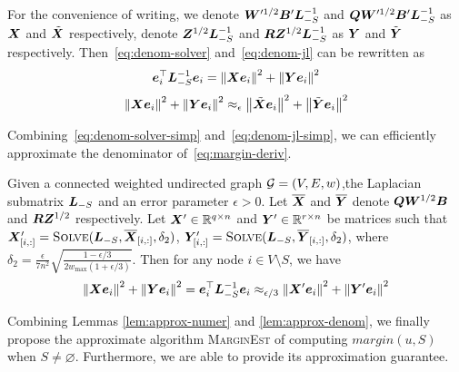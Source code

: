 \documentclass[sigconf]{acmart}
\begin{document}
For the convenience of writing, we denote \(\boldsymbol{W}'^{1/2}\boldsymbol{B}'\boldsymbol{L}_{-S}^{-1}\) and \(\boldsymbol{Q}\boldsymbol{W}'^{1/2}\boldsymbol{B}'\boldsymbol{L}_{-S}^{-1}\) as \(\boldsymbol{X}\) and \(\tilde{\boldsymbol{X}}\) respectively, denote \(\boldsymbol{Z}^{1/2}\boldsymbol{L}_{-S}^{-1}\) and \(\boldsymbol{R}\boldsymbol{Z}^{1/2}\boldsymbol{L}_{-S}^{-1}\) as \(\boldsymbol{Y}\) and \(\tilde{\boldsymbol{Y}}\) respectively.
Then~\eqref{eq:denom-solver} and~\eqref{eq:denom-jl} can be rewritten as
\begin{equation}\label{eq:denom-solver-simp}
    \boldsymbol{e}_i^\top\boldsymbol{L}_{-S}^{-1}\boldsymbol{e}_i=\left\Vert\boldsymbol{X}\boldsymbol{e}_i\right\Vert^2+\left\Vert\boldsymbol{Y}\boldsymbol{e}_i\right\Vert^2
\end{equation}
\begin{equation}\label{eq:denom-jl-simp}
    \left\Vert\boldsymbol{X}\boldsymbol{e}_i\right\Vert^2+\left\Vert\boldsymbol{Y}\boldsymbol{e}_i\right\Vert^2\approx_\epsilon\left\Vert\tilde{\boldsymbol{X}}\boldsymbol{e}_i\right\Vert^2+\left\Vert\tilde{\boldsymbol{Y}}\boldsymbol{e}_i\right\Vert^2
\end{equation}

Combining~\eqref{eq:denom-solver-simp} and~\eqref{eq:denom-jl-simp}, we can efficiently approximate the denominator of~\eqref{eq:margin-deriv}.
\begin{lemma}\label{lem:approx-denom}
    Given a connected weighted undirected graph \(\mathcal{G}=(V,E,w)\),the Laplacian submatrix \(\boldsymbol{L}_{-S}\) and an error parameter \(\epsilon>0\).
    Let \(\overline{\boldsymbol{X}}\) and \(\overline{\boldsymbol{Y}}\) denote \(\boldsymbol{Q}\boldsymbol{W}^{1/2}\boldsymbol{B}\) and \(\boldsymbol{R}\boldsymbol{Z}^{1/2}\) respectively.
    Let \(\boldsymbol{X}'\in\mathbb{R}^{q\times n}\) and \(\boldsymbol{Y}'\in\mathbb{R}^{r\times n}\) be matrices such that \(\boldsymbol{X}'_{[i,:]}=\textsc{Solve}(\boldsymbol{L}_{-S},\overline{\boldsymbol{X}}_{[i,:]},\delta_2)\), \(\boldsymbol{Y}'_{[i,:]}=\textsc{Solve}(\boldsymbol{L}_{-S},\overline{\boldsymbol{Y}}_{[i,:]},\delta_2)\), where \(\delta_2=\frac{\epsilon}{7n^2}\sqrt{\frac{1-\epsilon/3}{2w_{\max}(1+\epsilon/3)}}\). Then for any node \(i\in V\setminus S\), we have
    \begin{equation}\label{eq:approx-denom}
        \left\Vert\boldsymbol{X}\boldsymbol{e}_i\right\Vert^2+\left\Vert\boldsymbol{Y}\boldsymbol{e}_i\right\Vert^2=\boldsymbol{e}_i^\top\boldsymbol{L}_{-S}^{-1}\boldsymbol{e}_i\approx_{\epsilon/3}\left\Vert\boldsymbol{X}'\boldsymbol{e}_i\right\Vert^2+\left\Vert\boldsymbol{Y}'\boldsymbol{e}_i\right\Vert^2
    \end{equation}
\end{lemma}


Combining Lemmas \ref{lem:approx-numer} and \ref{lem:approx-denom}, we finally propose the approximate algorithm \textsc{MarginEst} of computing \(margin(u,S)\) when \(S\neq\varnothing\). Furthermore, we are able to provide its approximation guarantee.
\end{document}
